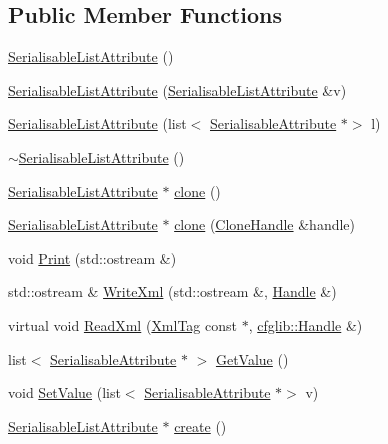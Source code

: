 \subsection*{Public Member Functions}
\begin{DoxyCompactItemize}
\item 
\hyperlink{classcfglib_1_1SerialisableListAttribute_a5952feba3ff71af2b1dc71d176d4b541}{Serialisable\+List\+Attribute} ()
\item 
\hyperlink{classcfglib_1_1SerialisableListAttribute_ac00d97a9d6f778a5ef70938807e17225}{Serialisable\+List\+Attribute} (\hyperlink{classcfglib_1_1SerialisableListAttribute}{Serialisable\+List\+Attribute} \&v)
\item 
\hyperlink{classcfglib_1_1SerialisableListAttribute_ab4fee35259518cd7223dc59a80fd8e8c}{Serialisable\+List\+Attribute} (list$<$ \hyperlink{classcfglib_1_1SerialisableAttribute}{Serialisable\+Attribute} $\ast$$>$ l)
\item 
\hyperlink{classcfglib_1_1SerialisableListAttribute_a375c9b6e54d8c1e4c12538d944ddb594}{$\sim$\+Serialisable\+List\+Attribute} ()
\item 
\hyperlink{classcfglib_1_1SerialisableListAttribute}{Serialisable\+List\+Attribute} $\ast$ \hyperlink{classcfglib_1_1SerialisableListAttribute_a8fe3db52648fbc4d6f08a4bdf7c78ea6}{clone} ()
\item 
\hyperlink{classcfglib_1_1SerialisableListAttribute}{Serialisable\+List\+Attribute} $\ast$ \hyperlink{classcfglib_1_1SerialisableListAttribute_a2bcd8907e26992e725a8a10b82288a0f}{clone} (\hyperlink{classcfglib_1_1CloneHandle}{Clone\+Handle} \&handle)
\item 
void \hyperlink{classcfglib_1_1SerialisableListAttribute_a3a76c800c9ebcd084b64c1c5f049caf5}{Print} (std\+::ostream \&)
\item 
std\+::ostream \& \hyperlink{classcfglib_1_1SerialisableListAttribute_a9e407c7a002d8ec7ed0b934842380736}{Write\+Xml} (std\+::ostream \&, \hyperlink{classcfglib_1_1Handle}{Handle} \&)
\item 
virtual void \hyperlink{classcfglib_1_1SerialisableListAttribute_a70350e44db8c97a8abfcf2d6bce82151}{Read\+Xml} (\hyperlink{classXmlTag}{Xml\+Tag} const $\ast$, \hyperlink{classcfglib_1_1Handle}{cfglib\+::\+Handle} \&)
\item 
list$<$ \hyperlink{classcfglib_1_1SerialisableAttribute}{Serialisable\+Attribute} $\ast$ $>$ \hyperlink{classcfglib_1_1SerialisableListAttribute_af8534bcf974bc68717fe369059b45146}{Get\+Value} ()
\item 
void \hyperlink{classcfglib_1_1SerialisableListAttribute_a0f6a00fb09fe4cbc2a875dc021201f02}{Set\+Value} (list$<$ \hyperlink{classcfglib_1_1SerialisableAttribute}{Serialisable\+Attribute} $\ast$$>$ v)
\item 
\hyperlink{classcfglib_1_1SerialisableListAttribute}{Serialisable\+List\+Attribute} $\ast$ \hyperlink{classcfglib_1_1SerialisableListAttribute_a00e99bbe0a913edc157e027f9ba9b8f0}{create} ()
\end{DoxyCompactItemize}
